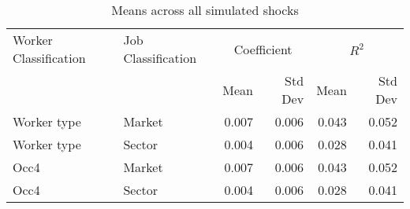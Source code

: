 \begin{table}
\centering
\caption{Means across all simulated shocks}
\label{table:all_sector_shocks_means}
\begin{tabular}{llrrrr}
\toprule
Worker Classification & Job Classification & \multicolumn{2}{c}{Coefficient} & \multicolumn{2}{c}{$R^2$} \\
               \hfill &             \hfill &        Mean & Std Dev &  Mean & Std Dev \\
\midrule
          Worker type &             Market &       0.007 &   0.006 & 0.043 &   0.052 \\
          Worker type &             Sector &       0.004 &   0.006 & 0.028 &   0.041 \\
                 Occ4 &             Market &       0.007 &   0.006 & 0.043 &   0.052 \\
                 Occ4 &             Sector &       0.004 &   0.006 & 0.028 &   0.041 \\
\bottomrule
\end{tabular}
\end{table}
